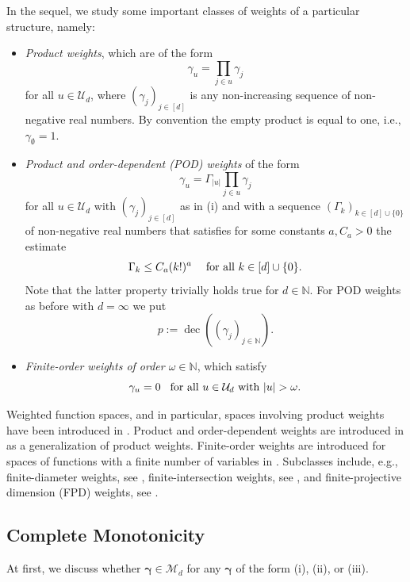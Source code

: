 \documentclass{article}
\newcommand{\N}  {{\mathbb N}}
\newcommand{\bg}{{\boldsymbol{\gamma}}}
\newcommand{\U}  {\mathcal{U}}
\newcommand{\M}  {\mathcal{M}}
\DeclareMathOperator{\decay}{dec}
\theoremstyle{plain}
\theoremstyle{definition}
\begin{document}
In the sequel, we study some important classes of weights of
a particular structure, namely:
\begin{itemize}
\item[(i)]
\emph{Product weights}, which are of the form
\[
\gamma_u = \prod_{j\in u} \gamma_j
\]
for all $u\in \U_d$, where $(\gamma_j)_{j\in [d]}$ 
is any non-increasing sequence
of non-negative real numbers.
By convention the empty product is 
equal to one, i.e., $\gamma_{\emptyset} = 1$. 
\item[(ii)]
\emph{Product and order-dependent (POD) weights} 
of the form
\[
\gamma_u = \Gamma_{|u|} \prod_{j\in u} \gamma_j
\]
for all $u \in \U_d$ with $(\gamma_j)_{j \in [d]}$ as in (i) 
and with a sequence $(\Gamma_k)_{k \in [d] \cup \{0\}}$ of
non-negative real numbers that satisfies
for some constants $a, C_a >0$ the estimate
\[
\Gamma_k \le C_a (k!)^a 
\hspace{3ex}\text{for all $k\in [d] \cup \{0\}$.}
\]
Note that the latter property trivially holds true 
for $d \in
\N$. For POD weights as before with $d = \infty$ we put
\[
p := \decay((\gamma_j)_{j \in \N}). 
\]
\item[(iii)]
\emph{Finite-order weights of order $\omega \in \N$}, which satisfy
\begin{equation*}
\gamma_u = 0
\hspace{2ex}\text{for all $u\in\U_d$ with $|u|>\omega$.}
\end{equation*}
\end{itemize}

Weighted function spaces, and in particular, spaces
involving product weights have been introduced in \citet{SW98}.
Product and order-dependent weights are introduced in \citet{KSS12}
as a generalization of product weights. 
Finite-order weights are introduced for spaces of functions with a
finite number of variables in \citet{DSWW06}. Subclasses include, 
e.g., finite-diameter weights, see \citet{NW08}, finite-intersection 
weights, see \citet{Gne10}, and finite-projective dimension (FPD) 
weights, see \citet{DG12}.

\subsection{Complete Monotonicity}

At first,
we discuss whether $\bg \in \M_d$ 
for any $\bg$ of the form (i), (ii), or (iii).
\end{document}
